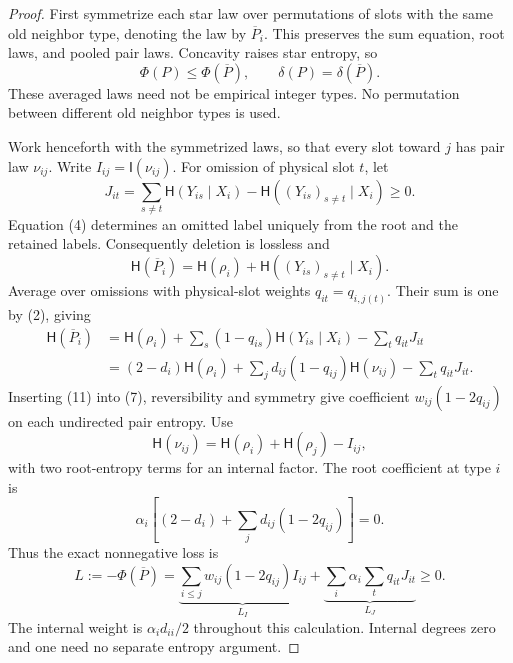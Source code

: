 \documentclass[11pt]{article}
\newcommand{\HH}{\mathsf H}
\newcommand{\II}{\mathsf I}
\begin{document}
\begin{proof}
First symmetrize each star law over permutations of slots with the
same old neighbor type, denoting the law by $\overline P_i$.
This preserves the sum equation, root laws, and pooled pair laws.
Concavity raises star entropy, so
\[
 \Phi(P)\leq\Phi(\overline P),\qquad
 \delta(P)=\delta(\overline P).                    \tag{10}
\]
These averaged laws need not be empirical integer types. No permutation
between different old neighbor types is used.

Work henceforth with the symmetrized laws, so that every slot toward
$j$ has pair law $\nu_{ij}$. Write $I_{ij}=\II(\nu_{ij})$.
For omission of physical slot $t$, let
\[
 J_{it}=\sum_{s\ne t}\HH(Y_{is}\mid X_i)
           -\HH((Y_{is})_{s\ne t}\mid X_i)\geq0.
\]
Equation (4) determines an omitted label uniquely from the root and
the retained labels. Consequently deletion is lossless and
\[
 \HH(\overline P_i)=\HH(\rho_i)
                 +\HH((Y_{is})_{s\ne t}\mid X_i).
\]
Average over omissions with physical-slot weights $q_{it}=q_{i,j(t)}$.
Their sum is one by (2), giving
\begin{align}
 \HH(\overline P_i)
 &=\HH(\rho_i)+\sum_s(1-q_{is})\HH(Y_{is}\mid X_i)
                            -\sum_tq_{it}J_{it}\nonumber\\
 &=(2-d_i)\HH(\rho_i)
       +\sum_jd_{ij}(1-q_{ij})\HH(\nu_{ij})
                            -\sum_tq_{it}J_{it}.   \tag{11}
\end{align}
Inserting (11) into (7), reversibility and symmetry give coefficient
$w_{ij}(1-2q_{ij})$ on each undirected pair entropy. Use
\[
 \HH(\nu_{ij})=\HH(\rho_i)+\HH(\rho_j)-I_{ij},
\]
with two root-entropy terms for an internal factor. The root coefficient
at type $i$ is
\[
 \alpha_i\left[(2-d_i)+\sum_jd_{ij}(1-2q_{ij})\right]=0.
\]
Thus the exact nonnegative loss is
\[
 L:=-\Phi(\overline P)
   =\underbrace{\sum_{i\leq j}w_{ij}(1-2q_{ij})I_{ij}}_{L_I}
    +\underbrace{\sum_i\alpha_i\sum_tq_{it}J_{it}}_{L_J}\geq0.
                                                               \tag{12}
\]
The internal weight is $\alpha_id_{ii}/2$ throughout this calculation.
Internal degrees zero and one need no separate entropy argument.


\end{proof}
\end{document}
